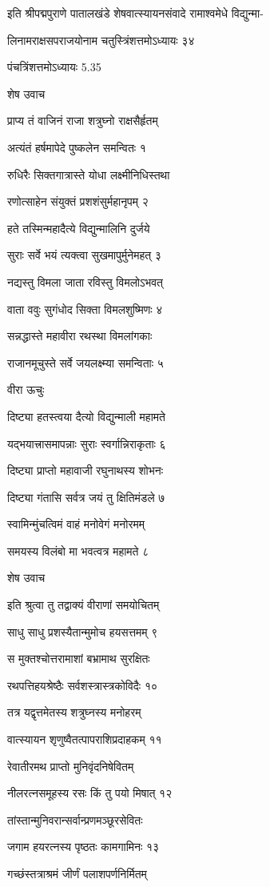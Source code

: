 इति श्रीपद्मपुराणे पातालखंडे शेषवात्स्यायनसंवादे रामाश्वमेधे विद्युन्मा-

लिनामराक्षसपराजयोनाम चतुस्त्रिंशत्तमोऽध्यायः ३४

पंचत्रिंशत्तमोऽध्यायः 5.35

शेष उवाच

प्राप्य तं वाजिनं राजा शत्रुघ्नो राक्षसैर्हृतम्

अत्यंतं हर्षमापेदे पुष्कलेन समन्वितः १

रुधिरैः सिक्तगात्रास्ते योधा लक्ष्मीनिधिस्तथा

रणोत्साहेन संयुक्तं प्रशशंसुर्महानृपम् २

हते तस्मिन्महादैत्ये विद्युन्मालिनि दुर्जये

सुराः सर्वे भयं त्यक्त्वा सुखमापुर्मुनेमहत् ३

नद्यस्तु विमला जाता रविस्तु विमलोऽभवत्

वाता ववुः सुगंधोद सिक्ता विमलशुष्मिणः ४

सन्नद्धास्ते महावीरा रथस्था विमलांगकाः

राजानमूचुस्ते सर्वे जयलक्ष्म्या समन्विताः ५

वीरा ऊचुः

दिष्ट्या हतस्त्वया दैत्यो विद्युन्माली महामते

यद्भयात्त्रासमापन्नाः सुराः स्वर्गान्निराकृताः ६

दिष्ट्या प्राप्तो महावाजी रघुनाथस्य शोभनः

दिष्ट्या गंतासि सर्वत्र जयं तु क्षितिमंडले ७

स्वामिन्मुंचत्विमं वाहं मनोवेगं मनोरमम्

समयस्य विलंबो मा भवत्वत्र महामते ८

शेष उवाच

इति श्रुत्वा तु तद्वाक्यं वीराणां समयोचितम्

साधु साधु प्रशस्यैतान्मुमोच हयसत्तमम् ९

स मुक्तश्चोत्तरामाशां बभ्रामाथ सुरक्षितः

रथपत्तिहयश्रेष्ठैः सर्वशस्त्रास्त्रकोविदैः १०

तत्र यद्वृत्तमेतस्य शत्रुघ्नस्य मनोहरम्

वात्स्यायन शृणुष्वैतत्पापराशिप्रदाहकम् ११

रेवातीरमथ प्राप्तो मुनिवृंदनिषेवितम्

नीलरत्नसमूहस्य रसः किं तु पयो मिषात् १२

तांस्तान्मुनिवरान्सर्वान्प्रणमञ्छूरसेवितः

जगाम हयरत्नस्य पृष्ठतः कामगामिनः १३

गच्छंस्तत्राश्रमं जीर्णं पलाशपर्णनिर्मितम्

